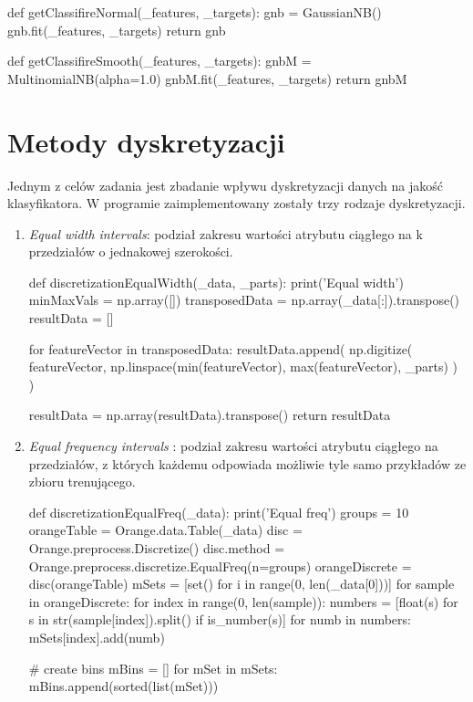 \documentclass[12pt,a4paper]{article}
\begin{document}
\begin{python}
def getClassifireNormal(_features, _targets):
    gnb = GaussianNB()
    gnb.fit(_features, _targets)
    return gnb

def getClassifireSmooth(_features, _targets):
    gnbM = MultinomialNB(alpha=1.0)
    gnbM.fit(_features, _targets)
    return gnbM
\end{python}

\section{Metody dyskretyzacji}
Jednym z celów zadania jest zbadanie wpływu dyskretyzacji danych na jakość klasyfikatora. W programie zaimplementowany zostały trzy rodzaje dyskretyzacji.
\begin{enumerate}
\item \emph{Equal width intervals}: podział zakresu wartości atrybutu ciągłego na k przedziałów o jednakowej szerokości.
\begin{python}
def discretizationEqualWidth(_data, _parts):
    print('Equal width')
    minMaxVals = np.array([])
    transposedData = np.array(_data[:]).transpose()
    resultData = []

    for featureVector in transposedData:
        resultData.append(
            np.digitize(
                featureVector,
                np.linspace(min(featureVector), max(featureVector), _parts)
            )
        )

    resultData = np.array(resultData).transpose()
    return resultData
\end{python}
\item \emph{Equal frequency intervals }: podział zakresu wartości atrybutu ciągłego na   przedziałów, z których każdemu odpowiada możliwie tyle samo przykładów ze zbioru trenującego.
\begin{python}

def discretizationEqualFreq(_data):
    print('Equal freq')
    groups = 10
    orangeTable = Orange.data.Table(_data)
    disc = Orange.preprocess.Discretize()
    disc.method = Orange.preprocess.discretize.EqualFreq(n=groups)
    orangeDiscrete = disc(orangeTable)
    mSets = [set() for i in range(0, len(_data[0]))]
    for sample in orangeDiscrete:
        for index in range(0, len(sample)):
            numbers = [float(s) for s in str(sample[index]).split() if is_number(s)]
            for numb in numbers:
                mSets[index].add(numb)

    # create bins
    mBins = []
    for mSet in mSets:
        mBins.append(sorted(list(mSet)))



\end{python}
\end{enumerate}
\end{document}
